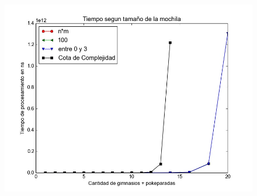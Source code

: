


  \begin{figure}[H]
      \begin{center}
        \includegraphics[width=0.7\columnwidth]{imagenes/exp2_ej1.jpeg}
        \caption{}
      \end{center}
  \end{figure}

